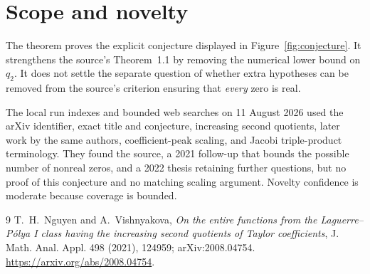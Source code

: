 \documentclass[11pt]{article}
\begin{document}
\section{Scope and novelty}

The theorem proves the explicit conjecture displayed in
Figure~\ref{fig:conjecture}.  It strengthens the source's Theorem~1.1 by
removing the numerical lower bound on $q_2$.  It does not settle the
separate question of whether extra hypotheses can be removed from the
source's criterion ensuring that \emph{every} zero is real.

The local run indexes and bounded web searches on 11 August 2026 used the
arXiv identifier, exact title and conjecture, increasing second quotients,
later work by the same authors, coefficient-peak scaling, and Jacobi
triple-product terminology.  They found the source, a 2021 follow-up that
bounds the possible number of nonreal zeros, and a 2022 thesis retaining
further questions, but no proof of this conjecture and no matching scaling
argument.  Novelty confidence is moderate because coverage is bounded.

\begin{thebibliography}{9}
T.~H.~Nguyen and A.~Vishnyakova,
\emph{On the entire functions from the Laguerre--P\'olya I class having the
increasing second quotients of Taylor coefficients},
J. Math. Anal. Appl. 498 (2021), 124959;
arXiv:2008.04754.
\url{https://arxiv.org/abs/2008.04754}.
\end{thebibliography}
\end{document}
